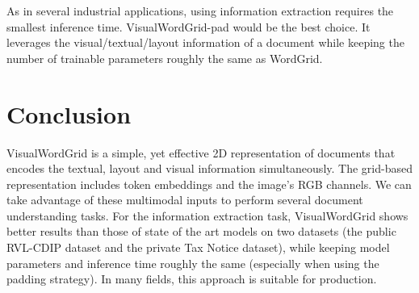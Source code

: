 \documentclass[conference]{IEEEtran}
\begin{document}
As in several industrial applications, using information extraction requires the smallest inference time. VisualWordGrid-pad would be the best choice. It leverages the visual/textual/layout information of a document while keeping the number of trainable parameters roughly the same as WordGrid. 

\section{Conclusion}
VisualWordGrid is a simple, yet  effective 2D representation of documents that encodes the textual, layout and visual information simultaneously. The grid-based representation includes token embeddings and the image's RGB channels. We can take advantage of these multimodal inputs to perform several document understanding tasks. For the information extraction task, VisualWordGrid shows better results than those of  state of the art models on two datasets (the public RVL-CDIP dataset and  the private Tax Notice dataset), while keeping model parameters and inference time roughly the same (especially when using the padding strategy). In many fields, this approach is suitable  for production.















{\small


}
\end{document}

